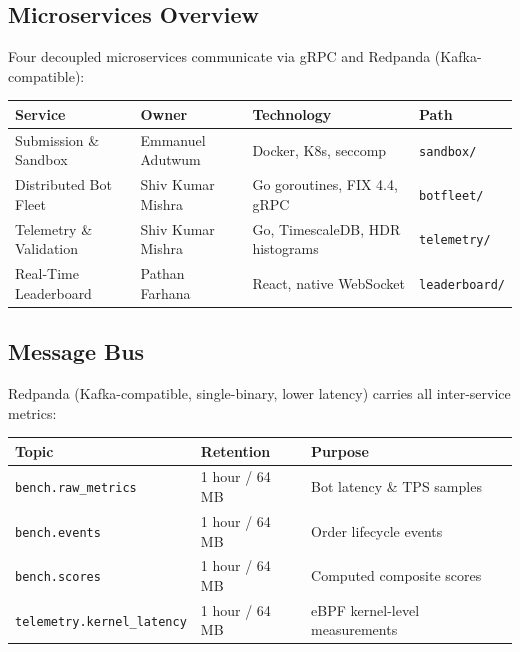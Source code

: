 \documentclass[12pt,a4paper]{article}
\begin{document}
\subsection{Microservices Overview}

Four decoupled microservices communicate via gRPC and Redpanda (Kafka-compatible):

\vspace{0.5em}
\begin{center}
\begin{tabular}{L{3.5cm} L{3.5cm} L{3.5cm} L{3cm}}
  \toprule
  \textbf{Service} & \textbf{Owner} & \textbf{Technology} & \textbf{Path} \\
  \midrule
  Submission \& Sandbox & Emmanuel Adutwum & Docker, K8s, seccomp & \texttt{sandbox/} \\
  Distributed Bot Fleet & Shiv Kumar Mishra & Go goroutines, FIX 4.4, gRPC & \texttt{botfleet/} \\
  Telemetry \& Validation & Shiv Kumar Mishra & Go, TimescaleDB, HDR histograms & \texttt{telemetry/} \\
  Real-Time Leaderboard & Pathan Farhana & React, native WebSocket & \texttt{leaderboard/} \\
  \bottomrule
\end{tabular}
\end{center}

\subsection{Message Bus}

Redpanda (Kafka-compatible, single-binary, lower latency) carries all inter-service metrics:

\begin{center}
\begin{tabular}{L{4.5cm} L{3.5cm} L{5cm}}
  \toprule
  \textbf{Topic} & \textbf{Retention} & \textbf{Purpose} \\
  \midrule
  \texttt{bench.raw\_metrics}    & 1 hour / 64 MB & Bot latency \& TPS samples \\
  \texttt{bench.events}          & 1 hour / 64 MB & Order lifecycle events \\
  \texttt{bench.scores}          & 1 hour / 64 MB & Computed composite scores \\
  \texttt{telemetry.kernel\_latency} & 1 hour / 64 MB & eBPF kernel-level measurements \\
  \bottomrule
\end{tabular}
\end{center}
\end{document}
